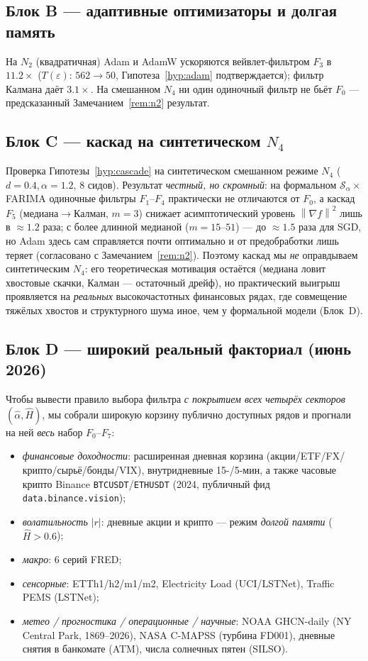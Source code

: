 \documentclass[conference]{IEEEtran}
\theoremstyle{plain}
\theoremstyle{definition}
\newcommand{\norm}[1]{\left\lVert#1\right\rVert}
\newcommand{\Sstable}{\mathcal{S}_\alpha}
\begin{document}
\subsection{Блок B --- адаптивные оптимизаторы и долгая память}
На $N_2$ (квадратичная) Adam и AdamW ускоряются вейвлет-фильтром
$F_3$ в $11.2\times$ ($T(\varepsilon)$: $562\to50$, Гипотеза~\ref{hyp:adam}
подтверждается); фильтр Калмана даёт $3.1\times$. На смешанном $N_4$
ни один одиночный фильтр не бьёт $F_0$ --- предсказанный
Замечанием~\ref{rem:n2} результат.

\subsection{Блок C --- каскад на синтетическом $N_4$}
\label{ssec:blockC}
Проверка Гипотезы~\ref{hyp:cascade} на синтетическом смешанном режиме
$N_4$ ($d{=}0.4,\alpha{=}1.2$, $8$ сидов). Результат \emph{честный, но
скромный}: на формальном $\Sstable\times$FARIMA одиночные фильтры
$F_1$--$F_4$ практически не отличаются от $F_0$, а каскад $F_5$
(медиана$\to$Калман, $m{=}3$) снижает асимптотический уровень
$\norm{\nabla f}^2$ лишь в $\approx1.2$ раза; с более длинной медианой
($m{=}15$--$51$) --- до $\approx1.5$ раза для SGD, но Adam здесь сам
справляется почти оптимально и от предобработки лишь теряет (согласовано
с Замечанием~\ref{rem:n2}). Поэтому каскад мы \emph{не} оправдываем
синтетическим $N_4$: его теоретическая мотивация остаётся (медиана ловит
хвостовые скачки, Калман --- остаточный дрейф), но практический выигрыш
проявляется на \emph{реальных} высокочастотных финансовых рядах, где
совмещение тяжёлых хвостов и структурного шума иное, чем у формальной
модели (Блок~D).

\subsection{Блок D --- широкий реальный факториал (июнь 2026)}
Чтобы вывести правило выбора фильтра \emph{с покрытием всех четырёх
секторов} $(\hat\alpha,\hat H)$, мы собрали широкую корзину публично
доступных рядов и прогнали на ней \emph{весь} набор $F_0$--$F_7$:

\begin{itemize}\setlength{\itemsep}{0pt}
\item \emph{финансовые доходности}: расширенная дневная корзина
(акции/ETF/FX/крипто/сырьё/бонды/VIX), внутридневные 15-/5-мин,
а также часовые крипто Binance \texttt{BTCUSDT}/\texttt{ETHUSDT} (2024,
публичный фид \texttt{data.binance.vision});
\item \emph{волатильность} $|r|$: дневные акции и крипто --- режим
\emph{долгой памяти} ($\hat H>0.6$);
\item \emph{макро}: 6 серий FRED;
\item \emph{сенсорные}: ETTh1/h2/m1/m2, Electricity Load (UCI/LSTNet),
Traffic PEMS (LSTNet);
\item \emph{метео / прогностика / операционные / научные}: NOAA
GHCN-daily (NY Central Park, 1869--2026), NASA C-MAPSS (турбина FD001),
дневные снятия в банкомате (ATM), числа солнечных пятен (SILSO).
\end{itemize}
\end{document}

